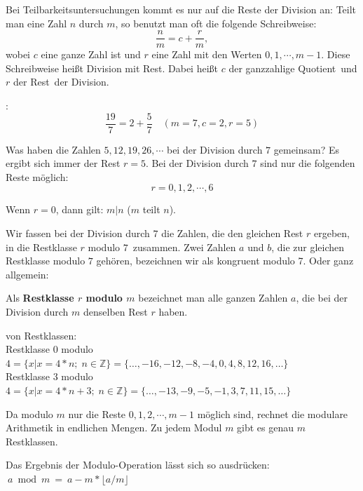 \begin{refsegment}
Bei Teilbarkeitsuntersuchungen kommt es nur auf die Reste der Division an:
Teilt man eine Zahl $n$ durch $m$, so benutzt man oft die folgende Schreibweise:
$$\frac{n}{m} = c + \frac{r}{m} ,$$
wobei $c$ eine ganze Zahl ist und $r$ eine Zahl mit den Werten $0,1,\cdots,
m-1$.
Diese Schreibweise heißt Division mit Rest. Dabei heißt $c$ der ganzzahlige
\glqq Quotient\grqq~und $r$ der \glqq Rest\grqq~der Division.

\begin{example}{:}
$$\frac{19}{7} = 2 + \frac{5}{7} \quad (m=7, c = 2, r = 5)$$
\end{example}

Was haben die Zahlen $5, 12, 19, 26, \cdots$ bei der Division durch $7$
gemeinsam?
Es ergibt sich immer der Rest $r = 5$.
Bei der Division durch $7$ sind nur die folgenden Reste möglich:
$$r = 0, 1, 2, \cdots, 6$$

Wenn $r = 0$, dann gilt: $m | n$ (\glqq  $m$ teilt $n$\grqq).

Wir fassen bei der Division durch $7$ die Zahlen, die den gleichen Rest $r$
ergeben, in die \glqq Restklasse $r$ modulo $7$\grqq~zusammen. Zwei Zahlen $a$
und $b$, die zur gleichen Restklasse modulo $7$ gehören, bezeichnen wir als
\glqq kongruent modulo 7\grqq. Oder ganz allgemein:

\begin{definition}\label{def-zth-remainder} 
Als \textbf{Restklasse $r$ modulo $m$} bezeichnet man alle ganzen Zahlen $a$, die
bei der Division durch $m$ denselben Rest $r$ haben.
\end{definition}

\begin{example}{ von Restklassen:}\\
\hspace*{2em}Restklasse $0$ modulo $4 = \{ x | x = 4*n; \; n \in \mathbb{Z} \} = \{ \dots, -16, -12, -8, -4, 0, 4, 8, 12, 16, \dots \}$\\
\hspace*{2em}Restklasse $3$ modulo $4 = \{ x | x = 4*n + 3;\; n \in \mathbb{Z} \} = \{ \dots, -13, -9, -5, -1, 3, 7, 11, 15, \dots \}$
\end{example}
Da modulo $m$ nur die Reste $0, 1, 2, \cdots, m-1$ möglich sind, rechnet die modulare Arithmetik in endlichen Mengen.
Zu jedem Modul $m$ gibt es genau $m$ Restklassen.

Das Ergebnis der Modulo-Operation lässt sich so ausdrücken:
$~a \bmod{m} ~ =  ~ a - m * \lfloor a/m \rfloor$\\




\end{refsegment}
